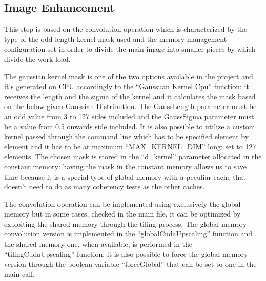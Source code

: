     \subsection{Image Enhancement}

    This step is based on the convolution operation which is characterized by the type of the odd-length kernel mask used and the memory management configuration set in order to divide the main image into smaller pieces by which divide the work load.   
    
    The gaussian kernel mask is one of the two options available in the project and it’s generated on CPU accordingly to the “Gaussuan Kernel Cpu” function: it receives the length and the sigma of the kernel and it calculates the mask based on the below given Gaussian Distribution. 
    The GaussLength parameter must be an odd value from 3 to 127 sides included and the GaussSigma parameter must be a value from 0.5 onwards side included.
    It is also possible to utilize a custom kernel passed through the command line which has to be specified element by element and it has to be at maximum “MAX_KERNEL_DIM”  long: set to 127 elements.
    The chosen mask is stored in the “d_kernel” parameter allocated in the constant memory: having the mask in the constant memory allows us to save time because it is a special type of global memory with a peculiar cache that doesn’t need to do as many coherency tests as the other caches.

    The convolution operation can be implemented using exclusively the global memory  but in some cases, checked in the main file, it can be optimized by exploiting the shared memory through the tiling process.
    The global memory convolution version is implemented in the “globalCudaUpscaling” function and the shared memory one, when available, is performed in the “tilingCudaUpscaling” function: it is also possible to force the global memory version through the boolean variable “forceGlobal” that can be set to one in the main call. 




